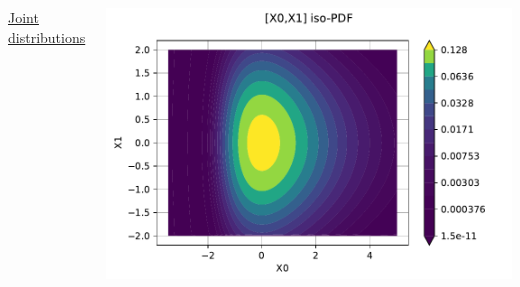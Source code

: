\documentclass{beamer}
\begin{document}
\begin{frame}[containsverbatim]
{\begin{columns}
    
\underline{Joint distributions}

    \includegraphics[width=\textwidth]{figures/Dist.pdf}

	
\end{columns}

}

\end{frame}


\end{document}
